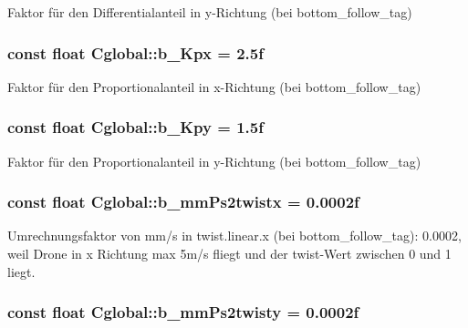 Faktor für den Differentialanteil in y-\/Richtung (bei bottom\_\-follow\_\-tag) 

\hypertarget{class_cglobal_ac4453024370993d15408d4a3235e95e8}{
\subsubsection[{b\_\-Kpx}]{\setlength{\rightskip}{0pt plus 5cm}const float {\bf Cglobal::b\_\-Kpx} = 2.5f}}
\label{class_cglobal_ac4453024370993d15408d4a3235e95e8}


Faktor für den Proportionalanteil in x-\/Richtung (bei bottom\_\-follow\_\-tag) 

\hypertarget{class_cglobal_aecfc05f716f9c1445fd10ad436972a9d}{
\subsubsection[{b\_\-Kpy}]{\setlength{\rightskip}{0pt plus 5cm}const float {\bf Cglobal::b\_\-Kpy} = 1.5f}}
\label{class_cglobal_aecfc05f716f9c1445fd10ad436972a9d}


Faktor für den Proportionalanteil in y-\/Richtung (bei bottom\_\-follow\_\-tag) 

\hypertarget{class_cglobal_ab0b5362dfd6addba8455bd753aa18e37}{
\subsubsection[{b\_\-mmPs2twistx}]{\setlength{\rightskip}{0pt plus 5cm}const float {\bf Cglobal::b\_\-mmPs2twistx} = 0.0002f}}
\label{class_cglobal_ab0b5362dfd6addba8455bd753aa18e37}


Umrechnungsfaktor von mm/s in twist.linear.x (bei bottom\_\-follow\_\-tag): 0.0002, weil Drone in x Richtung max 5m/s fliegt und der twist-\/Wert zwischen 0 und 1 liegt. 

\hypertarget{class_cglobal_aa70b2a6e29e8c452aab53cefaf77a01e}{
\subsubsection[{b\_\-mmPs2twisty}]{\setlength{\rightskip}{0pt plus 5cm}const float {\bf Cglobal::b\_\-mmPs2twisty} = 0.0002f}}
\label{class_cglobal_aa70b2a6e29e8c452aab53cefaf77a01e}


